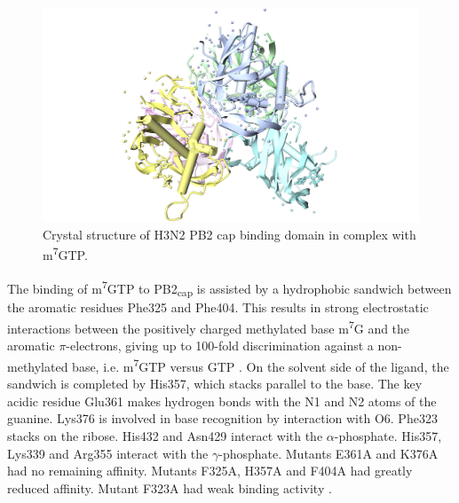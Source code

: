 \begin{figure}
\centering
\includegraphics[width=\linewidth]{../influenza/2VQZ.png}
\caption{Crystal structure of H3N2 PB2 cap binding domain in complex with m\textsuperscript{7}GTP.}
\label{influenza:2VQZ}
\end{figure}

The binding of m\textsuperscript{7}GTP to PB2\textsubscript{cap} is assisted by a hydrophobic sandwich between the aromatic residues Phe325 and Phe404. This results in strong electrostatic interactions between the positively charged methylated base m\textsuperscript{7}G and the aromatic $\pi$-electrons, giving up to 100-fold discrimination against a non-methylated base, i.e. m\textsuperscript{7}GTP versus GTP \citep{1192}. On the solvent side of the ligand, the sandwich is completed by His357, which stacks parallel to the base. The key acidic residue Glu361 makes hydrogen bonds with the N1 and N2 atoms of the guanine. Lys376 is involved in base recognition by interaction with O6. Phe323 stacks on the ribose. His432 and Asn429 interact with the $\alpha$-phosphate. His357, Lys339 and Arg355 interact with the $\gamma$-phosphate. Mutants E361A and K376A had no remaining affinity. Mutants F325A, H357A and F404A had greatly reduced affinity. Mutant F323A had weak binding activity \citep{1192}.

